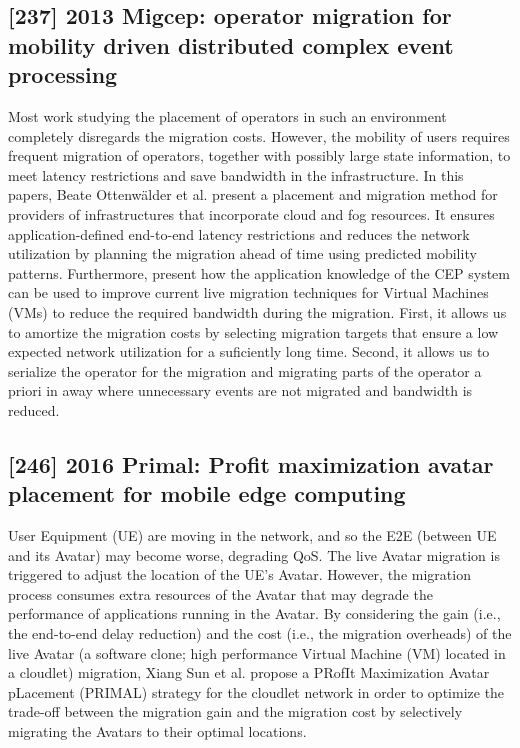 \subsection{[237] 2013 Migcep: operator migration for mobility driven distributed complex event processing}
\label{subsec:paper12}
Most work studying the placement of operators in such an environment completely disregards the migration costs. However, the mobility of users requires frequent migration of operators, together with possibly large state information, to meet latency restrictions and save bandwidth in the infrastructure. In this papers, Beate Ottenwälder et al. \cite{ottenwalder2013migcep} present a placement and migration method for providers of infrastructures that incorporate cloud and fog resources. It ensures application-defined end-to-end latency restrictions and reduces the network utilization by planning the migration ahead of time using predicted mobility patterns. Furthermore, present how the application knowledge of the CEP system can be used to improve current live migration techniques for Virtual Machines (VMs) to reduce the required bandwidth during the migration. First, it allows us to amortize the migration costs by selecting migration targets that ensure a low expected network utilization for a suficiently long time. Second, it allows us to serialize the operator for the migration and migrating parts of the operator a priori in away where unnecessary events are not migrated and bandwidth is reduced.

\subsection{[246] 2016 Primal: Profit maximization avatar placement for mobile edge computing}
\label{subsec:paper15}
User Equipment (UE) are moving in the network, and so the E2E (between UE and its Avatar) may become worse, degrading QoS. The live Avatar migration is triggered to adjust the location of the UE’s Avatar. However, the migration process consumes extra resources of the Avatar that may degrade the performance of applications running in the Avatar. By considering the gain (i.e., the end-to-end delay reduction) and the cost (i.e., the migration overheads) of the live Avatar (a software clone; high performance Virtual Machine (VM) located in a cloudlet) migration, Xiang Sun et al. \cite{sun2016primal} propose a PRofIt Maximization Avatar pLacement (PRIMAL) strategy for the cloudlet network in order to optimize the trade-off between the migration gain and the migration cost by selectively migrating the Avatars to their optimal locations.

